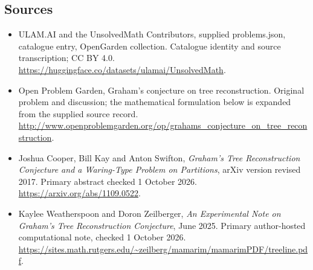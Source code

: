 \documentclass[11pt,a4paper]{article}
\begin{document}
\subsection{Sources}
\begin{itemize}
\item[S1] ULAM.AI and the UnsolvedMath Contributors, supplied problems.json, catalogue entry, OpenGarden collection. Catalogue identity and source transcription; CC BY 4.0.
\url{https://huggingface.co/datasets/ulamai/UnsolvedMath}.
\item[S2] Open Problem Garden, Graham's conjecture on tree reconstruction. Original problem and discussion; the mathematical formulation below is expanded from the supplied source record.
\url{http://www.openproblemgarden.org/op/grahams_conjecture_on_tree_reconstruction}.

\item[R1] Joshua Cooper, Bill Kay and Anton Swifton,
\emph{Graham's Tree Reconstruction Conjecture and a Waring-Type Problem
on Partitions}, arXiv version revised 2017. Primary abstract checked
1 October 2026.
\url{https://arxiv.org/abs/1109.0522}.
\item[R2] Kaylee Weatherspoon and Doron Zeilberger,
\emph{An Experimental Note on Graham's Tree Reconstruction Conjecture},
June 2025. Primary author-hosted computational note, checked 1 October 2026.
\url{https://sites.math.rutgers.edu/~zeilberg/mamarim/mamarimPDF/treeline.pdf}.

\end{itemize}
\end{document}
